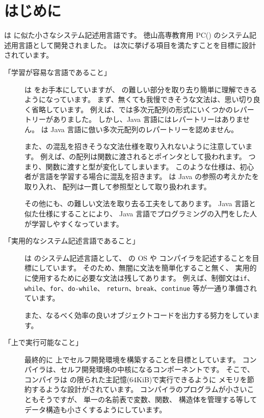 % 
%
\chapter{はじめに}

\cmml は \cl に似た小さなシステム記述用言語です。
徳山高専教育用 PC(\tac) のシステム記述用言語として開発されました。
\cmml は次に挙げる項目を満たすことを目標に設計されています。

\begin{description}
\item[「学習が容易な言語であること」]
\cmml は \cl をお手本にしていますが、
\cl の難しい部分を取り去り簡単に理解できるようになっています。
まず、無くても我慢できそうな文法は、思い切り良く省略しています。
例えば、\cl では多次元配列の形式にいくつかのレパートリーがありました。
しかし、Java 言語にはレパートリーはありません。
\cmml は Java 言語に倣い多次元配列のレパートリーを認めません。

また、\cl の混乱を招きそうな文法仕様を取り入れないように注意しています。
例えば、\cl の配列は関数に渡されるとポインタとして扱われます。
つまり、関数に渡すと型が変化してしまいます。
このような仕様は、初心者が言語を学習する場合に混乱を招きます。
\cmml は Java の参照の考えかたを取り入れ、
配列は一貫して参照型として取り扱われます。

その他にも、\cl の難しい文法を取り去る工夫をしてあります。
Java 言語と似た仕様にすることにより、
Java 言語でプログラミングの入門をした人が学習しやすくなっています。

\item[「実用的なシステム記述言語であること」]
\cmml は \tac のシステム記述言語として、
\tac の OS や \cmm コンパイラを記述することを目標にしています。
そのため、無闇に文法を簡単化すること無く、
実用的に使用するために必要な文法は残してあります。
例えば、制御文は{\tt if}、{\tt while}、{\tt for}、{\tt do-while}、
{\tt return}、{\tt break}、{\tt continue} 等が一通り準備されています。

また、なるべく効率の良いオブジェクトコードを出力する努力をしています。

\item[「\tac 上で実行可能なこと」]
最終的に \tac 上でセルフ開発環境を構築することを目標としています。
\cmm コンパイラは、セルフ開発環境の中核になるコンポーネントです。
そこで、\cmm コンパイラは \tac の限られた主記憶(64KiB)で実行できるように
メモリを節約するような設計がされています。
コンパイラのプログラムが小さいこともそうですが、
単一の名前表で変数、関数、
構造体を管理する等してデータ構造も小さくするようにしています。


\end{description}

